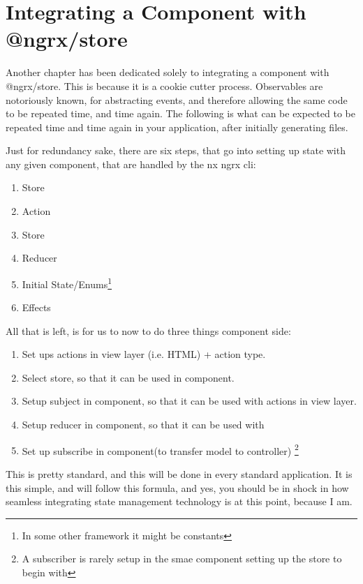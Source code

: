 \maketitle{}
\section{ Integrating a Component with @ngrx/store }

Another chapter has been dedicated solely to integrating a component
with @ngrx/store. This is because it is a cookie cutter process. Observables
are notoriously known, for abstracting events, and therefore allowing the same
code to be repeated time, and time again. The following is what can be expected
to be repeated time and time again in your application, after initially
generating files.

Just for redundancy sake, there are six steps, that go into setting up state
with any given component, that are handled by the nx ngrx cli:
\begin{enumerate}
  \item Store
  \item Action
  \item Store
  \item Reducer
  \item Initial State/Enums\footnote{In some other framework it might be constants}
  \item Effects
\end{enumerate}

All that is left, is for us to now to do three things component side:

\begin{enumerate}
  \item Set ups actions in view layer (i.e. HTML) + action type.
  \item Select store, so that it can be used in component.
  \item Setup subject in component, so that it can be used with actions in view layer.
  \item Setup reducer in component, so that it can be used with
  \item Set up subscribe in component(to transfer model to controller) \footnote{A subscriber is rarely setup in the smae component setting up the store to begin with}
\end{enumerate}

This is pretty standard, and this will be done in every standard application.
It is this simple, and will follow this formula, and yes, you should be in shock
in how seamless integrating state management technology is at this point,
because I am.

